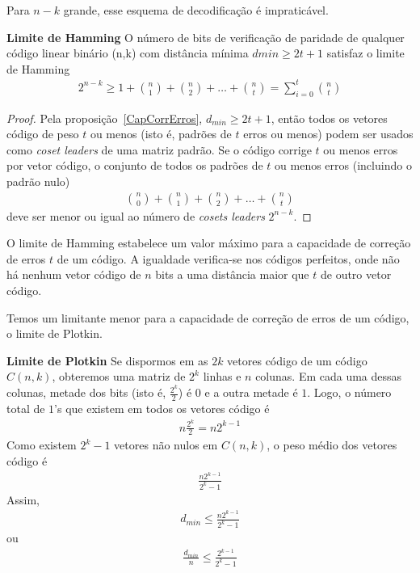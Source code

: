 Para $n-k$ grande, esse esquema de decodificação é impraticável.

\begin{theorem} {\bf Limite de Hamming} \label{LimHamm}   O número de bits de verificação de paridade de qualquer código linear binário (n,k) com distância mínima $dmin \geq 2t + 1$ satisfaz o limite de Hamming
\begin{align*}
2^{n-k} \geq  1 + \binom {n}{1} + \binom {n}{2} + \ldots + \binom {n}{t}=\displaystyle\sum_{i=0}^{t} \binom {n}{t}
\end{align*}
\end{theorem}

\begin{proof}  Pela proposição~\ref{CapCorrErros}, $d_{min} \geq 2t + 1$, então todos os vetores código de peso $t$ ou menos (isto é, padrões de $t$ erros ou menos) podem ser usados como \emph{coset leaders} de uma matriz padrão. Se o código corrige $t$ ou menos erros por vetor código, o conjunto de todos os padrões de $t$ ou menos erros (incluindo o padrão nulo)
\begin{align*}
\binom{n}{0} + \binom {n}{1} + \binom {n}{2} + \ldots + \binom {n}{t}
\end{align*}
deve ser menor ou igual ao número de \emph{cosets leaders} $2^{n-k}$.
\end{proof}

O limite de Hamming estabelece um valor máximo para a capacidade de correção de erros $t$ de um código. A igualdade verifica-se nos códigos perfeitos, onde não há nenhum vetor código de $n$ bits a uma distância maior que $t$ de outro vetor código.

Temos um limitante menor para a capacidade de correção de erros de um código, o limite de Plotkin.

\begin{theorem} {\bf Limite de Plotkin} \label{LimPlot}  Se dispormos em as $2k$ vetores código de um código $C(n,k)$, obteremos uma matriz de $2^k$ linhas e $n$ colunas. Em cada uma dessas colunas, metade dos bits (isto é, $\frac{2^k}{2}$) é $0$ e a outra metade é $1$. Logo, o número total de $1$'s que existem em todos os vetores código é
\begin{align*}
n\frac{2^k}{2}=n2^{k-1}
\end{align*}
Como existem $2^k-1$ vetores não nulos em $C(n,k)$, o peso médio dos vetores código é
\begin{align*}
\frac{n2^{k-1}}{2^k-1}
\end{align*}
Assim,
\begin{align*}
d_{min} \leq \frac{n2^{k-1}}{2^k-1}
\end{align*}
ou
\begin{align*}
\frac{d_{min}}{n} \leq \frac{2^{k-1}}{2^k-1}
\end{align*}
\end{theorem}

